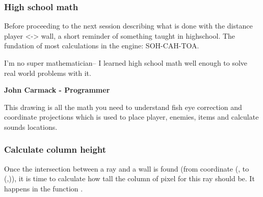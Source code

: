 \subsubsection{High school math}
Before proceeding to the next session describing what is done with the distance player <-> wall, a short reminder of something taught in highschool. The fundation of most calculations in the engine: SOH-CAH-TOA.\\
\par
 \begin{fancyquotes}
  I'm no super mathematician-- I learned high school math well enough to solve real world problems with it.\\
 \par
\textbf{John Carmack - Programmer}
 \end{fancyquotes}


\par
\begin{figure}[H]
\centering
 
\end{figure}



This drawing is all the math you need to understand fish eye correction and coordinate projections which is used to place player, enemies, items and calculate sounds locations.\\






\subsubsection{Calculate column height}
Once the intersection between a ray and a wall is found (from coordinate (, to (,)), it is time to calculate how tall the column of pixel for this ray should be. It happens in the function .\\

\begin{minipage}{\textwidth}

\end{minipage}

